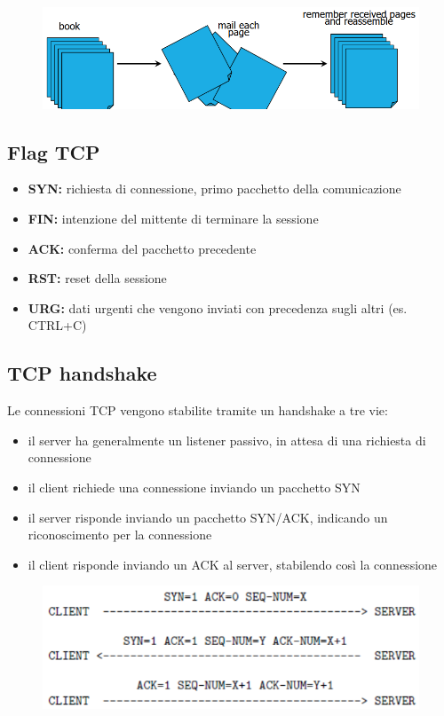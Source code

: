 \begin{figure}[H]
    \centering
    \includegraphics[width=1\linewidth]{chapters/8/images/tcp.png}
\end{figure}

\subsection{Flag TCP}
\begin{itemize}
    \item \textbf{SYN:} richiesta di connessione, primo pacchetto della comunicazione 
    \item \textbf{FIN:} intenzione del mittente di terminare la sessione
    \item \textbf{ACK:} conferma del pacchetto precedente
    \item \textbf{RST:} reset della sessione 
    \item \textbf{URG:} dati urgenti che vengono inviati con precedenza sugli altri (es. CTRL+C) 
\end{itemize}

\subsection{TCP handshake}
Le connessioni TCP vengono stabilite tramite un handshake a tre vie:
\begin{itemize}
    \item il server ha generalmente un listener passivo, in attesa di una richiesta di connessione 
    \item il client richiede una connessione inviando un pacchetto SYN 
    \item il server risponde inviando un pacchetto SYN/ACK, indicando un riconoscimento per la connessione 
    \item il client risponde inviando un ACK al server, stabilendo così la connessione
\end{itemize}

\begin{figure}[H]
    \centering
    \includegraphics[width=0.8\linewidth]{chapters/8/images/tcp-handshake.png}
\end{figure}

